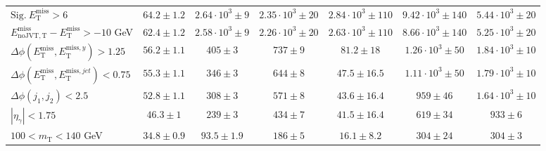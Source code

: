 \begin{table}[h!]
\begin{tabular}{lcccccc}
$\mathrm{Sig.}\ E_{\mathrm{T}}^{\mathrm{miss}}>6$ & $64.2 \pm 1.2$ & $2.64\cdot 10^{3} \pm 9$ & $2.35\cdot 10^{3} \pm 20$ & $2.84\cdot 10^{3} \pm 110$ & $9.42\cdot 10^{3} \pm 140$ & $5.44\cdot 10^{3} \pm 20$ \\
$E_{\mathrm{noJVT,T}}^{\mathrm{miss}}-E_{\mathrm{T}}^{\mathrm{miss}}>-10$ GeV & $62.4 \pm 1.2$ & $2.58\cdot 10^{3} \pm 9$ & $2.26\cdot 10^{3} \pm 20$ & $2.63\cdot 10^{3} \pm 110$ & $8.66\cdot 10^{3} \pm 140$ & $5.25\cdot 10^{3} \pm 20$ \\
$\Delta\phi(E_{\mathrm{T}}^{\mathrm{miss}},E_{\mathrm{T}}^{\mathrm{miss},y})>1.25$ & $56.2 \pm 1.1$ & $405 \pm 3$ & $737 \pm 9$ & $81.2 \pm 18$ & $1.26\cdot 10^{3} \pm 50$ & $1.84\cdot 10^{3} \pm 10$ \\
$\Delta\phi(E_{\mathrm{T}}^{\mathrm{miss}},E_{\mathrm{T}}^{\mathrm{miss},jet})<0.75$ & $55.3 \pm 1.1$ & $346 \pm 3$ & $644 \pm 8$ & $47.5 \pm 16.5$ & $1.11\cdot 10^{3} \pm 50$ & $1.79\cdot 10^{3} \pm 10$ \\
$\Delta\phi(j_1,j_2)<2.5$ & $52.8 \pm 1.1$ & $308 \pm 3$ & $571 \pm 8$ & $43.6 \pm 16.4$ & $959 \pm 46$ & $1.64\cdot 10^{3} \pm 10$ \\
$|\eta_{\gamma}|<1.75$ & $46.3 \pm 1$ & $239 \pm 3$ & $434 \pm 7$ & $41.5 \pm 16.4$ & $619 \pm 34$ & $933 \pm 6$ \\
$100 < m_{\mathrm{T}} < 140$ GeV & $34.8 \pm 0.9$ & $93.5 \pm 1.9$ & $186 \pm 5$ & $16.1 \pm 8.2$ & $304 \pm 24$ & $304 \pm 3$ \\
\hline

\end{tabular}

\end{table}



